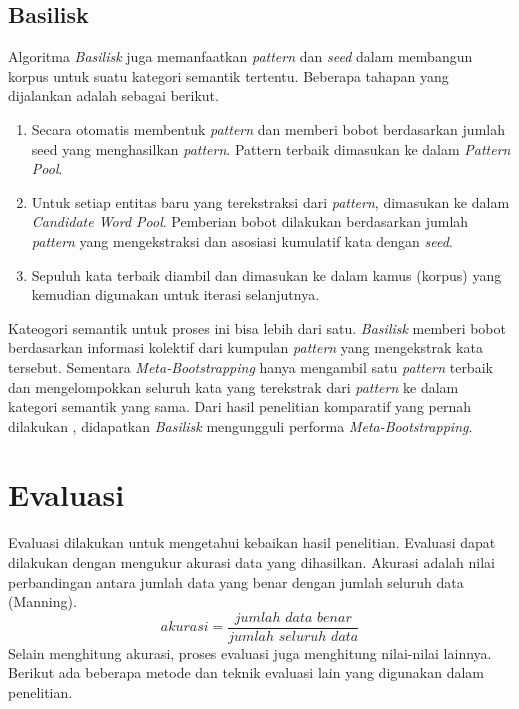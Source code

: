\subsection{Basilisk}
Algoritma \textit{Basilisk} \citep{thelen2002bootstrapping} juga memanfaatkan \textit{pattern} dan \textit{seed} dalam membangun korpus untuk suatu kategori semantik tertentu. Beberapa tahapan yang dijalankan adalah sebagai berikut.
\begin{enumerate}
  \item Secara otomatis membentuk \textit{pattern} dan memberi bobot berdasarkan jumlah seed yang menghasilkan \textit{pattern}. Pattern terbaik dimasukan ke dalam \textit{Pattern Pool}.
  \item Untuk setiap entitas baru yang terekstraksi dari \textit{pattern}, dimasukan ke dalam \textit{Candidate Word Pool}. Pemberian bobot dilakukan berdasarkan jumlah \textit{pattern} yang mengekstraksi dan asosiasi kumulatif kata dengan \textit{seed}.
  \item Sepuluh kata terbaik diambil dan dimasukan ke dalam kamus (korpus) yang kemudian digunakan untuk iterasi selanjutnya. 
\end{enumerate}

Kateogori semantik untuk proses ini bisa lebih dari satu. \textit{Basilisk} memberi bobot berdasarkan informasi kolektif dari kumpulan \textit{pattern} yang mengekstrak kata tersebut. Sementara \textit{Meta-Bootstrapping} hanya mengambil satu \textit{pattern} terbaik dan mengelompokkan seluruh kata yang terekstrak dari \textit{pattern} ke dalam kategori semantik yang sama. Dari hasil penelitian komparatif yang pernah dilakukan \citep{riloff2003learning}, didapatkan \textit{Basilisk} mengungguli performa \textit{Meta-Bootstrapping}. 


\section{Evaluasi}
Evaluasi dilakukan untuk mengetahui kebaikan hasil penelitian. Evaluasi dapat dilakukan dengan mengukur akurasi data yang dihasilkan. Akurasi adalah nilai perbandingan antara jumlah data yang benar dengan jumlah seluruh data (Manning). 
\[ akurasi=\frac{jumlah\,\,data\,\,benar}{jumlah\,\,seluruh\,\,data} \]
Selain menghitung akurasi, proses evaluasi juga menghitung nilai-nilai lainnya. Berikut ada beberapa metode dan teknik evaluasi lain yang digunakan dalam penelitian.


